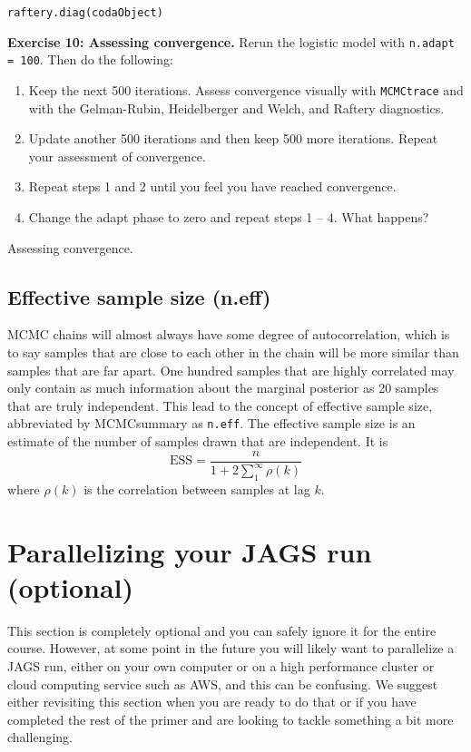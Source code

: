 \documentclass[12pt,english]{article}
\begin{document}
\bigskip
\noindent\texttt{raftery.diag(codaObject)}

\bigskip
\belowcaptionskip=-40pt
\begin{exercise}
\begin{mdframed}
\doublespacing
\textbf{Exercise 10: Assessing convergence.} Rerun the logistic model with \texttt{n.adapt = 100}. Then do the following:
\begin{enumerate}
\item Keep the next 500 iterations. Assess convergence visually with \texttt{MCMCtrace} and with the Gelman-Rubin, Heidelberger and Welch, and Raftery diagnostics.
\item Update another 500 iterations and then keep 500 more iterations. Repeat your assessment of convergence. 
\item Repeat steps 1 and 2 until you feel you have reached convergence.
\item Change the adapt phase to zero and repeat steps 1 -- 4. What happens?
\end{enumerate}
\end{mdframed}
\captionsetup{textformat=empty, labelformat=empty}
\caption[Assessing convergence]{Assessing convergence.}
\label{ex:assessing convergence}
\end{exercise}
\belowcaptionskip=0pt

\subsection{Effective sample size (n.eff)\label{n.eff}}
MCMC chains will almost always have some degree of autocorrelation, which is to say samples that are close to each other in the chain will be more similar than samples that are far apart.  One hundred samples that are highly correlated may only contain as much information about the marginal posterior as 20 samples that are truly independent.  This lead to the concept of effective sample size, abbreviated by MCMCsummary as \texttt{n.eff}.  The effective sample size is an estimate of the number of samples drawn that are independent.  It is $$\text{ESS} = \frac{n}{1+2\sum_1^\infty \rho(k)}$$ where $\rho(k)$ is the correlation between samples at lag $k$.

\section{Parallelizing your JAGS run (optional)}

This section is completely optional and you can safely ignore it for the entire course. However, at some point in the future you will likely want to parallelize a JAGS run, either on your own computer or on a high performance cluster or cloud computing service such as AWS, and this can be confusing. We suggest either revisiting this section when you are ready to do that or if you have completed the rest of the primer and are looking to tackle something a bit more challenging.
\end{document}
